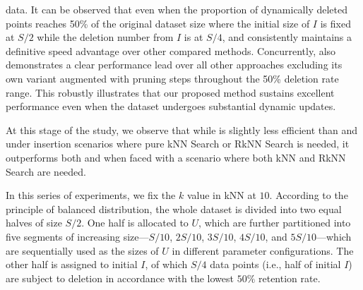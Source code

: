 data. It can be observed that even when the proportion of dynamically deleted points reaches 50\% of the original dataset size where the initial size of $I$ is fixed at $S/2$ while the deletion number from $I$ is at $S/4$, \cpdualtree and \spdualtree consistently maintains a definitive speed advantage over other compared methods. Concurrently, \dualtree also demonstrates a clear performance lead over all other approaches excluding its own variant augmented with pruning steps throughout the 50\% deletion rate range. This robustly illustrates that our proposed method sustains excellent performance even when the dataset undergoes substantial dynamic updates.

At this stage of the study, we observe that while \dualtree is slightly less efficient than \hdrtree and \deltatree under insertion scenarios where pure kNN Search or RkNN Search is needed, it outperforms both \deltatree and \hdrtree when faced with a scenario where both kNN and RkNN Search are needed.

In this series of experiments, we fix the $k$ value in kNN at $10$. According to the principle of balanced distribution, the whole dataset is divided into two equal halves of size $S/2$. One half is allocated to $U$, which are further partitioned into five segments of increasing size—$S/10$, $2S/10$, $3S/10$, $4S/10$, and $5S/10$—which are sequentially used as the sizes of $U$ in different parameter configurations. The other half is assigned to initial $I$, of which $S/4$ data points (i.e., half of initial $I$) are subject to deletion in accordance with the lowest $50\%$ retention rate. 

